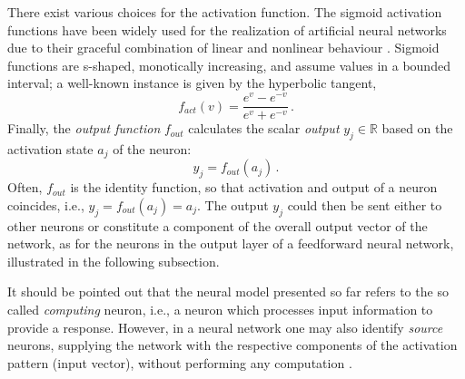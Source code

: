 \documentclass[longtitle]{elsarticle}
\numberwithin{equation}{section}
\theoremstyle{theorem}
\theoremstyle{definition}
\theoremstyle{remark}
\theoremstyle{proposition}
\numberwithin{figure}{section}
\begin{document}
		There exist various choices for the activation function. The sigmoid activation functions have been widely used for the realization of artificial neural networks due to their graceful combination of linear and nonlinear behaviour \cite{Hay05}. Sigmoid functions are s-shaped, monotically increasing, and assume values in a bounded interval; a well-known instance is given by the hyperbolic tangent,
		\begin{equation*}
			\label{eq:hyperbolic-tangent}
			f_{act}(v) = \dfrac{e^{v} - e^{-v}}{e^v + e^{-v}} \, .
		\end{equation*}
		Finally, the \emph{output function} $f_{out}$ calculates the scalar \emph{output} $y_j \in \mathbb{R}$ based on the activation state $a_j$ of the neuron:
		\begin{equation*}
			\label{eq:output-function}
			y_j = f_{out}(a_j) \, .
		\end{equation*} 
		Often, $f_{out}$ is the identity function, so that activation and output of a neuron coincides, i.e., $y_j = f_{out}(a_j) = a_j$. The output $y_j$ could then be sent either to other neurons or constitute a component of the overall output vector of the network, as for the neurons in the output layer of a feedforward neural network, illustrated in the following subsection.
		
		It should be pointed out that the neural model presented so far refers to the so called \emph{computing} neuron, i.e., a neuron which processes input information to provide a response. However, in a neural network one may also identify \emph{source} neurons, supplying the network with the respective components of the activation pattern (input vector), without performing any computation \cite{Hay05}.
		
\end{document}
